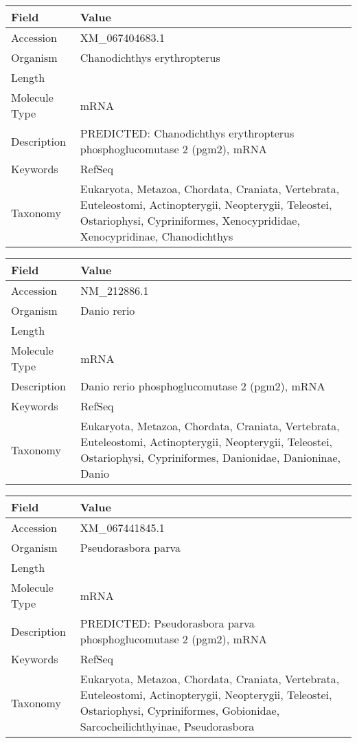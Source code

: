 \documentclass[10pt]{article}
\begin{document}
{\footnotesize
\begin{longtable}{>{\raggedright\arraybackslash}p{4.5cm} >{\raggedright\arraybackslash}p{11.5cm}}
\textbf{Field} & \textbf{Value} \\
\hline
Accession & XM\_067404683.1 \\
Organism & Chanodichthys erythropterus \\
Length & 2805 \\
Molecule Type & mRNA \\
Description & PREDICTED: Chanodichthys erythropterus phosphoglucomutase 2 (pgm2), mRNA \\
Keywords & RefSeq \\
Taxonomy & Eukaryota, Metazoa, Chordata, Craniata, Vertebrata, Euteleostomi, Actinopterygii, Neopterygii, Teleostei, Ostariophysi, Cypriniformes, Xenocyprididae, Xenocypridinae, Chanodichthys \\
\end{longtable}
}

{\footnotesize
\begin{longtable}{>{\raggedright\arraybackslash}p{4.5cm} >{\raggedright\arraybackslash}p{11.5cm}}
\textbf{Field} & \textbf{Value} \\
\hline
Accession & NM\_212886.1 \\
Organism & Danio rerio \\
Length & 3462 \\
Molecule Type & mRNA \\
Description & Danio rerio phosphoglucomutase 2 (pgm2), mRNA \\
Keywords & RefSeq \\
Taxonomy & Eukaryota, Metazoa, Chordata, Craniata, Vertebrata, Euteleostomi, Actinopterygii, Neopterygii, Teleostei, Ostariophysi, Cypriniformes, Danionidae, Danioninae, Danio \\
\end{longtable}
}

{\footnotesize
\begin{longtable}{>{\raggedright\arraybackslash}p{4.5cm} >{\raggedright\arraybackslash}p{11.5cm}}
\textbf{Field} & \textbf{Value} \\
\hline
Accession & XM\_067441845.1 \\
Organism & Pseudorasbora parva \\
Length & 3125 \\
Molecule Type & mRNA \\
Description & PREDICTED: Pseudorasbora parva phosphoglucomutase 2 (pgm2), mRNA \\
Keywords & RefSeq \\
Taxonomy & Eukaryota, Metazoa, Chordata, Craniata, Vertebrata, Euteleostomi, Actinopterygii, Neopterygii, Teleostei, Ostariophysi, Cypriniformes, Gobionidae, Sarcocheilichthyinae, Pseudorasbora \\
\end{longtable}
}
\end{document}
